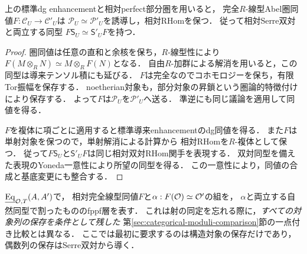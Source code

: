 \begin{lemma}[完全線型同値と相対perfect部分圏]
\label{lem:abel-equivalence-preserves-relative-perfect}
上の標準dg enhancementと相対perfect部分圏を用いると，
完全$R$-線型Abel圏同値$F:\mathcal C_U\to\mathcal C'_U$は
$\mathcal P_U\simeq\mathcal P'_U$を誘導し，相対RHomを保つ．
従って相対Serre双対と両立する同型
$F\mathsf S_U\simeq\mathsf S'_U F$を持つ．
\end{lemma}
\begin{proof}
圏同値は任意の直和と余核を保ち，$R$-線型性により
$F(M\otimes_R N)\simeq M\otimes_R F(N)$となる．
自由$R$-加群による解消を用いると，この同型は導来テンソル積にも延びる．
$F$は完全なのでコホモロジーを保ち，有限Tor振幅を保存する．
noetherian対象も，部分対象の昇鎖という圏論的特徴付けにより保存する．
よって$F$は$\mathcal P_U$を$\mathcal P'_U$へ送る．
準逆にも同じ議論を適用して同値を得る．

$F$を複体に項ごとに適用すると標準導来enhancementのdg同値を得る．
また$F$は単射対象を保つので，単射解消による計算から
相対RHomを$R$-複体として保つ．
従って$F\mathsf S_U$と$\mathsf S'_U F$は同じ相対双対RHom関手を表現する．
双対同型を備えた表現のYoneda一意性により所望の同型を得る．
この一意性により，同値の合成と基底変更にも整合する．
\end{proof}

$\underline{\operatorname{Eq}}_{\mathcal O,T}(A,A')$で，
相対完全線型同値$F$と$\alpha:F(\mathcal O)\simeq\mathcal O'$の組を，
$\alpha$と両立する自然同型で割ったもののfppf層を表す．
これは射の同定を忘れる際に，\emph{すべての対象列の保存を条件として残した}
第\ref{sec:categorical-moduli-comparison}節の一点付き比較とは異なる．
ここでは最初に要求するのは構造対象の保存だけであり，
偶数列の保存はSerre双対から導く．

